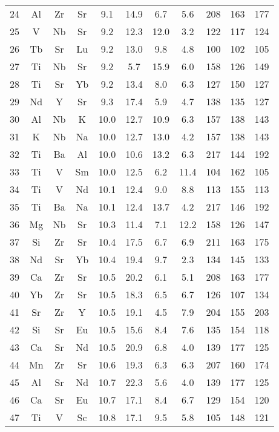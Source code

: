 \begin{center}
\begin{xtabular}{c|ccc|cccc|ccc}
 24 &  Al &  Zr &  Sr & 9.1 &  14.9 & 6.7 & 5.6 & 208 & 163 & 177 \\
 25 &   V &  Nb &  Sr & 9.2 &  12.3 &  12.0 & 3.2 & 122 & 117 & 124 \\
 26 &  Tb &  Sr &  Lu & 9.2 &  13.0 & 9.8 & 4.8 & 100 & 102 & 105 \\
 27 &  Ti &  Nb &  Sr & 9.2 & 5.7 &  15.9 & 6.0 & 158 & 126 & 149 \\
 28 &  Ti &  Sr &  Yb & 9.2 &  13.4 & 8.0 & 6.3 & 127 & 150 & 127 \\
 29 &  Nd &   Y &  Sr & 9.3 &  17.4 & 5.9 & 4.7 & 138 & 135 & 127 \\
 30 &  Al &  Nb &   K &  10.0 &  12.7 &  10.9 & 6.3 & 157 & 138 & 143 \\
 31 &   K &  Nb &  Na &  10.0 &  12.7 &  13.0 & 4.2 & 157 & 138 & 143 \\
 32 &  Ti &  Ba &  Al &  10.0 &  10.6 &  13.2 & 6.3 & 217 & 144 & 192 \\
 33 &  Ti &   V &  Sm &  10.0 &  12.5 & 6.2 &  11.4 & 104 & 162 & 105 \\
 34 &  Ti &   V &  Nd &  10.1 &  12.4 & 9.0 & 8.8 & 113 & 155 & 113 \\
 35 &  Ti &  Ba &  Na &  10.1 &  12.4 &  13.7 & 4.2 & 217 & 146 & 192 \\
 36 &  Mg &  Nb &  Sr &  10.3 &  11.4 & 7.1 &  12.2 & 158 & 126 & 147 \\
 37 &  Si &  Zr &  Sr &  10.4 &  17.5 & 6.7 & 6.9 & 211 & 163 & 175 \\
 38 &  Nd &  Sr &  Yb &  10.4 &  19.4 & 9.7 & 2.3 & 134 & 145 & 133 \\
 39 &  Ca &  Zr &  Sr &  10.5 &  20.2 & 6.1 & 5.1 & 208 & 163 & 177 \\
 40 &  Yb &  Zr &  Sr &  10.5 &  18.3 & 6.5 & 6.7 & 126 & 107 & 134 \\
 41 &  Sr &  Zr &   Y &  10.5 &  19.1 & 4.5 & 7.9 & 204 & 155 & 203 \\
 42 &  Si &  Sr &  Eu &  10.5 &  15.6 & 8.4 & 7.6 & 135 & 154 & 118 \\
 43 &  Ca &  Sr &  Nd &  10.5 &  20.9 & 6.8 & 4.0 & 139 & 177 & 125 \\
 44 &  Mn &  Zr &  Sr &  10.6 &  19.3 & 6.3 & 6.3 & 207 & 160 & 174 \\
 45 &  Al &  Sr &  Nd &  10.7 &  22.3 & 5.6 & 4.0 & 139 & 177 & 125 \\
 46 &  Ca &  Sr &  Eu &  10.7 &  17.1 & 8.4 & 6.7 & 129 & 154 & 120 \\
 47 &  Ti &   V &  Sc &  10.8 &  17.1 & 9.5 & 5.8 & 105 & 148 & 121 \\

\end{xtabular}
\end{center}
